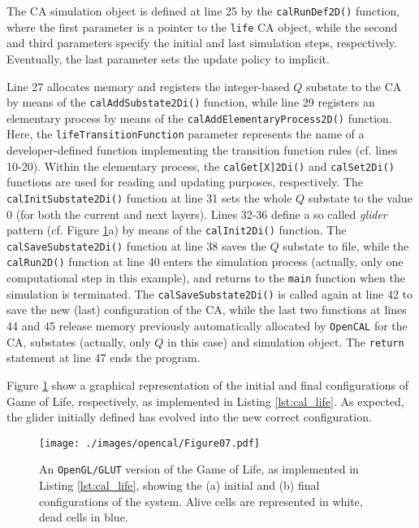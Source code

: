 The CA simulation object is defined at line 25 by the
\verb'calRunDef2D()' function, where the first parameter is a
pointer to the \verb'life' CA object, while the second and third
parameters specify the initial and last simulation steps,
respectively. Eventually, the last parameter sets the update
policy to implicit.

Line 27 allocates memory and registers the integer-based $Q$
substate to the CA by means of the \verb'calAddSubstate2Di()'
function, while line 29 registers an elementary process by means
of the \verb'calAddElementaryProcess2D()' function. Here, the
\verb'lifeTransitionFunction' parameter represents the name of a
developer-defined function implementing the transition function
rules (cf. lines 10-20). Within the elementary process, the
\verb'calGet[X]2Di()' and \verb'calSet2Di()' functions are used
for reading and updating purposes, respectively. The
\verb'calInitSubstate2Di()' function at line 31 sets the whole $Q$
substate to the value 0 (for both the current and next
layers). Lines 32-36 define a so called \emph{glider} pattern
(cf. Figure \ref{fig:cal_life_glut}a) by means of the
\verb'calInit2Di()' function. The \verb'calSaveSubstate2Di()'
function at line 38 saves the $Q$ substate to file, while the
\verb'calRun2D()' function at line 40 enters the simulation
process (actually, only one computational step in this example),
and returns to the \verb'main' function when the simulation is
terminated. The \verb'calSaveSubstate2Di()' is called again at
line 42 to save the new (last) configuration of the CA, while the
last two functions at lines 44 and 45 release memory previously
automatically allocated by \texttt{OpenCAL} for the CA, substates
(actually, only $Q$ in this case) and simulation object. The
\verb'return' statement at line 47 ends the program.

Figure \ref{fig:cal_life_glut} show a graphical representation of
the initial and final configurations of Game of Life,
respectively, as implemented in Listing \ref{lst:cal_life}. As
expected, the glider initially defined has evolved into the new
correct configuration.

\begin{figure}
	\begin{center}
		\texttt{[image: ./images/opencal/Figure07.pdf]}
		\caption{An \texttt{OpenGL/GLUT} version of the Game of Life, as implemented in Listing \ref{lst:cal_life}, showing the (a) initial and (b) final configurations of the system. Alive cells are represented in white, dead cells in blue.}
		\label{fig:cal_life_glut}
	\end{center}
\end{figure}

